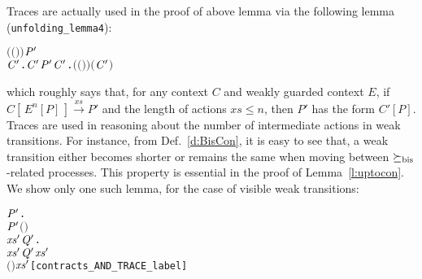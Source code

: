 Traces are actually used in the proof of above lemma via 
the following lemma (\texttt{unfolding_lemma4}):
\begin{alltt}
\HOLTokenTurnstile{}   \HOLSymConst{\HOLTokenConj{}}   \HOLSymConst{\HOLTokenConj{}}  \ensuremath{(}\ensuremath{(} \HOLSymConst{\HOLTokenCompose}   \ensuremath{)} \ensuremath{)}  \ensuremath{\HOLFreeVar{P}\sp{\prime}} \HOLSymConst{\HOLTokenConj{}}   \HOLSymConst{\HOLTokenLeq{}}  \HOLSymConst{\HOLTokenImp{}}
   \HOLSymConst{\HOLTokenExists{}}\ensuremath{\HOLBoundVar{C}\sp{\prime}}.  \ensuremath{\HOLBoundVar{C}\sp{\prime}} \HOLSymConst{\HOLTokenConj{}} \ensuremath{\HOLFreeVar{P}\sp{\prime}} \HOLSymConst{\ensuremath{=}} \ensuremath{\HOLBoundVar{C}\sp{\prime}}  \HOLSymConst{\HOLTokenConj{}} \HOLSymConst{\HOLTokenForall{}}.  \ensuremath{(}\ensuremath{(} \HOLSymConst{\HOLTokenCompose}   \ensuremath{)} \ensuremath{)}  \ensuremath{(}\ensuremath{\HOLBoundVar{C}\sp{\prime}} \ensuremath{)}
\end{alltt}
which roughly says that, for any context $C$ and weakly guarded context
$E$, if $C [\, E^n[P]\,] \overset{xs}{\longrightarrow} P'$ and the length
of actions $xs \leqslant n$, then $P'$ has the form $C'[P]$.
Traces are used in reasoning about the number of intermediate actions in weak
transitions. For instance, from Def.~\ref{d:BisCon}, it is easy
to see that, a weak transition either becomes shorter
or remains the same when moving between $\mathrel{\succeq_{\rm{bis}}}$-related processes.
This property is essential in the proof of
Lemma~\ref{l:uptocon}. We show only one such lemma, for the case of
visible weak transitions:
\begin{alltt}
\HOLTokenTurnstile{}  \HOLSymConst{\HOLTokenContracts{}}  \HOLSymConst{\HOLTokenImp{}}
   \HOLSymConst{\HOLTokenForall{}}  \ensuremath{\HOLBoundVar{P}\sp{\prime}}.
          \ensuremath{\HOLBoundVar{P}\sp{\prime}} \HOLSymConst{\HOLTokenConj{}}  \ensuremath{(} \ensuremath{)}  \HOLSymConst{\HOLTokenImp{}}
       \HOLSymConst{\HOLTokenExists{}}\ensuremath{\HOLBoundVar{xs}\sp{\prime}} \ensuremath{\HOLBoundVar{Q}\sp{\prime}}.
             \ensuremath{\HOLBoundVar{xs}\sp{\prime}} \ensuremath{\HOLBoundVar{Q}\sp{\prime}} \HOLSymConst{\HOLTokenConj{}}  \HOLSymConst{\HOLTokenContracts{}}  \HOLSymConst{\HOLTokenConj{}}  \ensuremath{\HOLBoundVar{xs}\sp{\prime}} \HOLSymConst{\HOLTokenLeq{}}   \HOLSymConst{\HOLTokenConj{}}
            \ensuremath{(} \ensuremath{)} \ensuremath{\HOLBoundVar{xs}\sp{\prime}}\hfill{[contracts_AND_TRACE_label]}
\end{alltt}

